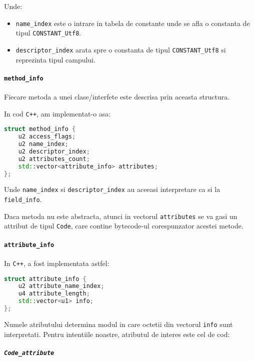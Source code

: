 Unde:
\begin{itemize}
    \item \texttt{name\_index} este o intrare in tabela de constante unde se afla o constanta de tipul \texttt{CONSTANT\_Utf8}.
    \item \texttt{descriptor\_index} arata spre o constanta de tipul \texttt{CONSTANT\_Utf8} si reprezinta tipul campului.
\end{itemize}

\paragraph{\texorpdfstring{\texttt{method\_info}}{method\_info}}\label{method_info}

Fiecare metoda a unei clase/interfete este descrisa prin aceasta
structura.

In cod \texttt{C++}, am implementat-o asa:

\begin{lstlisting}[language=C++]
struct method_info {
    u2 access_flags;
    u2 name_index;
    u2 descriptor_index;
    u2 attributes_count;
    std::vector<attribute_info> attributes;
};
\end{lstlisting}

Unde \texttt{name\_index} si \texttt{descriptor\_index} au aceeasi
interpretare ca si la \texttt{field\_info}.

Daca metoda nu este abstracta, atunci in vectorul \texttt{attributes} se
va gasi un attribut de tipul \texttt{Code}, care contine bytecode-ul
corespunzator acestei metode.

\paragraph{\texorpdfstring{\texttt{attribute\_info}}{attribute\_info}}\label{attribute_info}

In \texttt{C++}, a fost implementata astfel:

\begin{lstlisting}[language=C++]
struct attribute_info {
    u2 attribute_name_index;
    u4 attribute_length;
    std::vector<u1> info;
};
\end{lstlisting}

Numele atributului determina modul in care octetii din vectorul
\texttt{info} sunt interpretati. Pentru intentiile noastre, atributul de
interes este cel de cod:

\subparagraph{\texorpdfstring{\texttt{Code\_attribute}}{Code\_attribute}}\label{code_attribute}

